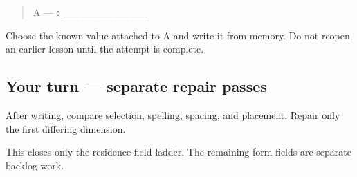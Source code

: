\begin{quote}
A — \textbf{: \_\_\_\_\_\_\_\_\_\_}
\end{quote}

Choose the known value attached to A and write it from memory. Do not reopen an earlier lesson until the attempt is complete.

\subsection*{Your turn — separate repair passes}
After writing, compare selection, spelling, spacing, and placement. Repair only the first differing dimension.

\begin{tcolorbox}[breakable,colback=teal!4,colframe=teal!35!black,title={Before you move on}]
This closes only the residence-field ladder. The remaining form fields are separate backlog work.
\end{tcolorbox}

